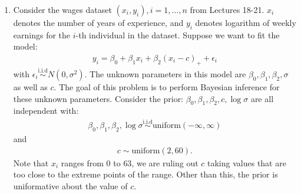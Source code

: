 \documentclass{scrartcl}
\begin{document}
\begin{enumerate}
\item Consider the wages dataset $(x_i, y_i), i = 1, \dots, n$ from
  Lectures 18-21. $x_i$ denotes the number of years of experience, and
  $y_i$ denotes logarithm of weekly earnings for the $i$-th individual
  in the dataset. Suppose we want to fit the model:
  \begin{align*}
    y_i = \beta_0 + \beta_1 x_i + \beta_2 (x_i - c)_+ + \epsilon_i 
  \end{align*}
  with $\epsilon_i \overset{\text{i.i.d}}{\sim} N(0, \sigma^2)$. The
  unknown parameters in this model are $\beta_0, \beta_1, \beta_2,
  \sigma$ as well as $c$. The goal of this problem is to perform
  Bayesian inference for these  unknown parameters. Consider the
  prior: $\beta_0, \beta_1, \beta_2, c, \log \sigma$ are all
  independent with:
  \begin{align*}
    \beta_0, \beta_1, \beta_2, \log \sigma
    \overset{\text{i.i.d}}{\sim} \text{uniform}(-\infty, \infty)
  \end{align*}
  and
  \begin{align*}
    c \sim \text{uniform}(2, 60). 
  \end{align*}
  Note that $x_i$ ranges from $0$ to $63$, we are ruling out $c$
  taking values that are too close to the extreme points of the
  range. Other than this, the prior is uniformative about the value of
  $c$.


\end{enumerate}
\end{document}

